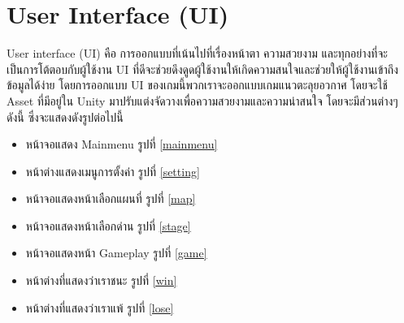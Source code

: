 \section{User Interface (UI)}
User interface (UI) คือ การออกแบบที่เน้นไปที่เรื่องหน้าตา ความสวยงาม และทุกอย่างที่จะเป็นการโต้ตอบกับผู้ใช้งาน UI ที่ดีจะช่วยดึงดูดผู้ใช้งานให้เกิดความสนใจและช่วยให้ผู้ใช้งานเข้าถึงข้อมูลได้ง่าย
โดยการออกแบบ UI ของเกมนี้พวกเราจะออกแบบเกมแนวตะลุยอวกาศ โดยจะใช้ Asset ที่มีอยู่ใน Unity มาปรับแต่งจัดวางเพื่อความสวยงามและความน่าสนใจ โดยจะมีส่วนต่างๆ ดังนี้ ซึ่งจะแสดงดังรูปต่อไปนี้
\begin{itemize}
\item หน้าจอแสดง Mainmenu รูปที่ \ref{mainmenu}
\item หน้าต่างแสดงเมนูการตั้งค่า รูปที่ \ref{setting}
\item หน้าจอแสดงหน้าเลือกแผนที่ รูปที่ \ref{map}
\item หน้าจอแสดงหน้าเลือกด่าน รูปที่ \ref{stage}
\item หน้าจอแสดงหน้า Gameplay รูปที่ \ref{game}
\item หน้าต่างที่แสดงว่าเราชนะ รูปที่ \ref{win}
\item หน้าต่างที่แสดงว่าเราแพ้ รูปที่ \ref{lose}
\end{itemize}


